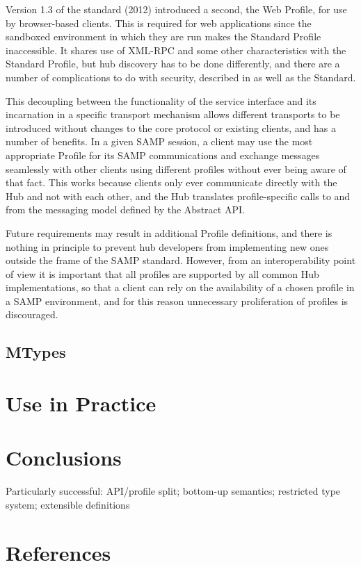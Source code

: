 \documentclass[5p]{elsarticle}
\begin{document}
Version 1.3 of the standard (2012) introduced a second, the Web Profile,
for use by browser-based clients.
This is required for web applications since the sandboxed environment
in which they are run makes the Standard Profile inaccessible.
It shares use of XML-RPC and some other characteristics with the
Standard Profile, but hub discovery has to be done differently,
and there are a number of complications to do with security,
described in \citet{adassxxi_paper} as well as the Standard.

This decoupling between the functionality of the service interface
and its incarnation in a specific transport mechanism
allows different transports to be introduced without changes to the core
protocol or existing clients, and has a number of benefits.
In a given SAMP session, a client may use the most appropriate
Profile for its SAMP communications and exchange
messages seamlessly with other clients using different profiles
without ever being aware of that fact.
This works because clients only ever
communicate directly with the Hub and not with each other,
and the Hub translates profile-specific calls to and from
the messaging model defined by the Abstract API.

Future requirements may result in additional Profile definitions,
and there is nothing in principle to prevent hub developers
from implementing new ones outside the frame of the SAMP standard.
However, from an interoperability point of view it is important
that all profiles are supported by all common Hub implementations,
so that a client can rely on the availability of a chosen profile
in a SAMP environment, and for this reason unnecessary proliferation
of profiles is discouraged.



\subsection{MTypes}

% 


\section{Use in Practice} \label{sec:usage}

\section{Conclusions} \label{sec:conclusion}

Particularly successful: API/profile split; bottom-up semantics;
restricted type system; extensible definitions
  

\section*{References}


\end{document}
